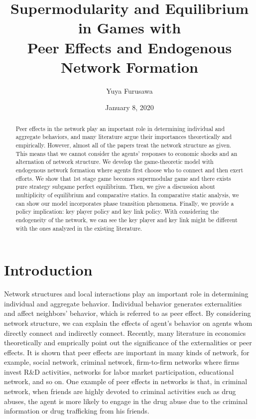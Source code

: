 \documentclass[12pt]{article}
\theoremstyle{definition}
\begin{document}
\title{Supermodularity and Equilibrium in Games with \\ Peer Effects and Endogenous Network Formation}

\author{Yuya Furusawa}

\date{January 8, 2020}

\maketitle

\begin{abstract}
Peer effects in the network play an important role in determining individual and aggregate behaviors, and many literature argue their importances theoretically and empirically.
However, almost all of the papers treat the network structure as given.
This means that we cannot consider the agents' responses to economic shocks and an alternation of network structure.
We develop the game-theoretic model with endogenous network formation where agents first choose who to connect and then exert efforts.
We show that 1st stage game becomes supermodular game and there exists pure strategy subgame perfect equilibrium.
Then, we give a discussion about multiplicity of equilibrium and comparative statics.
In comparative static analysis, we can show our model incorporates phase transition phenomena.
Finally, we provide a policy implication: key player policy and key link policy.
With considering the endogeneity of the network, we can see the key player and key link might be different with the ones analyzed in the existing literature.
\end{abstract}


\section{Introduction}

Network structures and local interactions play an important role in determining individual and aggregate behavior.
Individual behavior generates externalities and affect neighbors' behavior, which is referred to as peer effect.
By considering network structure, we can explain the effects of agent's behavior on agents whom directly connect and indirectly connect.
Recently, many literature in economics theoretically and emprically point out the significance of the externalities or peer effects.
It is shown that peer effects are important in many kinds of network, for example, social network, criminal network, firm-to-firm networks where firms invest R\&D activities, networks for labor market participation, educational network, and so on.
One example of peer effects in networks is that, in criminal network, when friends are highly devoted to criminal activities such as drug abuses, the agent is more likely to engage in the drug abuse due to the criminal information or drug trafficking from his friends.
\end{document}
